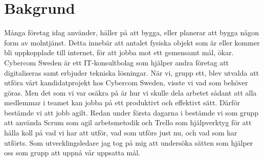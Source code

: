 \section{Bakgrund}
\label{sec:Lieth-background}
Många företag idag använder, håller på att bygga, eller planerar att bygga någon form av molntjänst. Detta innebär att antalet fysiska objekt som är eller 
kommer bli uppkopplade till internet, för att jobba mot ett gemensamt mål, ökar. Cybercom Sweden är ett IT-konsultbolag som hjälper andra företag att 
digitaliseras samt erbjuder tekniska lösningar. När vi, grupp ett, blev utvalda att utföra vårt kandidatprojekt hos Cybercom Sweden, visste vi vad som 
behöver göras. Men det som vi var osäkra på är hur vi skulle dela arbetet sådant att  alla medlemmar i teamet kan jobba på ett produktivt och effektivt 
sätt. Därför bestämde vi att jobb agilt. Redan under första dagarna i bestämde vi som grupp att använda Scrum som agil arbetsmetodik och Trello som 
hjälpverktyg för att hålla koll på vad vi har att utför, vad som utförs just nu, och vad som har utförts. Som utvecklingsledare jag tog på mig att undersöka 
sätten som hjälper oss som grupp att uppnå vår uppsatta mål. 
